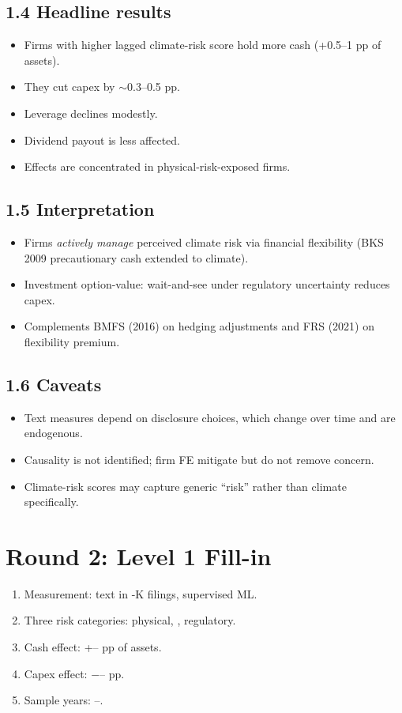 \documentclass[11pt]{article}
\newcommand{\blank}[1]{\underline{\hspace{#1}}}
\begin{document}
\subsection*{1.4 Headline results}
\begin{itemize}
\item Firms with higher lagged climate-risk score hold more cash (+0.5--1 pp of assets).
\item They cut capex by $\sim$0.3--0.5 pp.
\item Leverage declines modestly.
\item Dividend payout is less affected.
\item Effects are concentrated in physical-risk-exposed firms.
\end{itemize}

\subsection*{1.5 Interpretation}
\begin{itemize}
\item Firms \emph{actively manage} perceived climate risk via financial flexibility (BKS 2009 precautionary cash extended to climate).
\item Investment option-value: wait-and-see under regulatory uncertainty reduces capex.
\item Complements BMFS (2016) on hedging adjustments and FRS (2021) on flexibility premium.
\end{itemize}

\subsection*{1.6 Caveats}
\begin{alertbox}
\begin{itemize}
\item Text measures depend on disclosure choices, which change over time and are endogenous.
\item Causality is not identified; firm FE mitigate but do not remove concern.
\item Climate-risk scores may capture generic ``risk'' rather than climate specifically.
\end{itemize}
\end{alertbox}

\section*{Round 2: Level 1 Fill-in}
\begin{enumerate}
\item Measurement: text in \blank{1cm}-K filings, supervised ML.
\item Three risk categories: physical, \blank{1.5cm}, regulatory.
\item Cash effect: +\blank{1cm}--\blank{1cm} pp of assets.
\item Capex effect: $-$\blank{1cm}--\blank{1cm} pp.
\item Sample years: \blank{1cm}--\blank{1cm}.
\end{enumerate}
\end{document}
